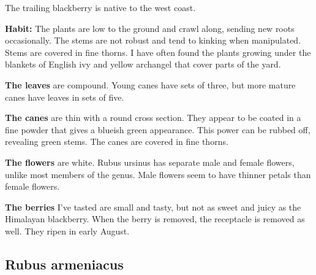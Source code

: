 The trailing blackberry is native to the west coast.

\textbf{Habit:} The plants are low to the ground and crawl along, sending new roots occasionally. The stems are not robust and tend to kinking when manipulated. Stems are covered in fine thorns. I have often found the plants growing under the blankets of English ivy and yellow archangel that cover parts of the yard.

\textbf{The leaves} are compound. Young canes have sets of three, but more mature canes have leaves in sets of five.

\textbf{The canes} are thin with a round cross section. They appear to be coated in a fine powder that gives a blueish green appearance. This power can be rubbed off, revealing green stems. The canes are covered in fine thorns.

\textbf{The flowers} are white. Rubus ursinus has separate male and female flowers, unlike most members of the genus. Male flowers seem to have thinner petals than female flowers.

\textbf{The berries} I've tasted are small and tasty, but not as sweet and juicy as the Himalayan blackberry. When the berry is removed, the receptacle is removed as well. They ripen in early August. 


\newpage

\subsection{Rubus armeniacus}

